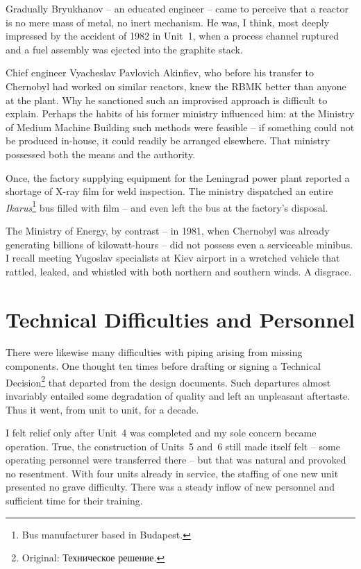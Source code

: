 \documentclass[openright]{bookest}
\begin{document}
Gradually Bryukhanov -- an educated engineer -- came to perceive that a reactor is no mere mass of metal, no inert mechanism. He was, I think, most deeply impressed by the accident of 1982 in Unit~1, when a process channel ruptured and a fuel assembly was ejected into the graphite stack.

Chief engineer Vyacheslav Pavlovich Akinfiev, who before his transfer to Chernobyl had worked on similar reactors, knew the RBMK better than anyone at the plant. Why he sanctioned such an improvised approach is difficult to explain. Perhaps the habits of his former ministry influenced him: at the Ministry of Medium Machine Building such methods were feasible -- if something could not be produced in-house, it could readily be arranged elsewhere. That ministry possessed both the means and the authority.

Once, the factory supplying equipment for the Leningrad power plant reported a shortage of X-ray film for weld inspection. The ministry dispatched an entire \textit{Ikarus}\footnote{Bus manufacturer based in Budapest.} bus filled with film -- and even left the bus at the factory's disposal.

The Ministry of Energy, by contrast -- in 1981, when Chernobyl was already generating billions of kilowatt-hours -- did not possess even a serviceable minibus. I recall meeting Yugoslav specialists at Kiev airport in a wretched vehicle that rattled, leaked, and whistled with both northern and southern winds. A disgrace.

\section{Technical Difficulties and Personnel}

There were likewise many difficulties with piping arising from missing components. One thought ten times before drafting or signing a Technical Decision\footnote{Original: Техническое решение.} that departed from the design documents. Such departures almost invariably entailed some degradation of quality and left an unpleasant aftertaste. Thus it went, from unit to unit, for a decade.

I felt relief only after Unit~4 was completed and my sole concern became operation. True, the construction of Units~5 and~6 still made itself felt -- some operating personnel were transferred there -- but that was natural and provoked no resentment. With four units already in service, the staffing of one new unit presented no grave difficulty. There was a steady inflow of new personnel and sufficient time for their training.
\end{document}
